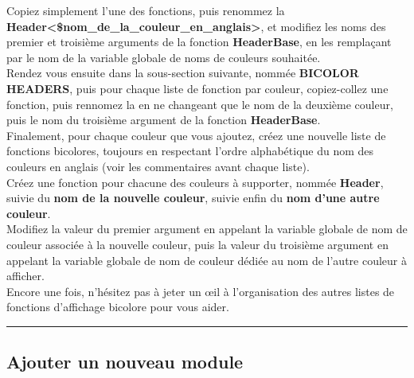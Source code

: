 \documentclass[a4paper,10pt]{article}
\begin{document}
Copiez simplement l'une des fonctions, puis renommez la \textbf{\color{mauve}Header<\$nom\_de\_la\_couleur\_en\_anglais>},
et modifiez les noms des premier et troisième arguments de la fonction \textbf{\color{mauve}HeaderBase}, en les
remplaçant par le nom de la variable globale de noms de couleurs souhaitée.\\[1\baselineskip]

Rendez vous ensuite dans la sous-section suivante, nommée \textbf{BICOLOR HEADERS}, puis pour chaque liste de fonction par couleur, copiez-collez une fonction, puis rennomez la en ne changeant que le nom de la deuxième couleur, puis le nom du troisième argument de la fonction \textbf{\color{mauve}HeaderBase}.\\[1\baselineskip]

Finalement, pour chaque couleur que vous ajoutez, créez une nouvelle liste de fonctions bicolores,
toujours en respectant l'ordre alphabétique du nom des couleurs en anglais (voir les commentaires
avant chaque liste).\\[1\baselineskip]

Créez une fonction pour chacune des couleurs à supporter, nommée \textbf{\color{mauve}Header}, suivie du \textbf{\color{mauve}nom de la nouvelle couleur}, suivie enfin du \textbf{\color{mauve}nom d'une autre couleur}.\\[1\baselineskip]

Modifiez la valeur du premier argument en appelant la variable globale de nom de couleur associée à la nouvelle couleur, puis la valeur du troisième argument en appelant la variable globale de nom de couleur dédiée au nom de l'autre couleur à afficher.\\[1\baselineskip]

Encore une fois, n'hésitez pas à jeter un œil à l'organisation des autres listes de fonctions d'affichage\linebreak
bicolore pour vous aider.\\[1\baselineskip]




\color{green}\par\noindent\rule{\textwidth}{0.4pt}\color{white}

\color{green}
\subsection{Ajouter un nouveau module}\color{white}
\end{document}
